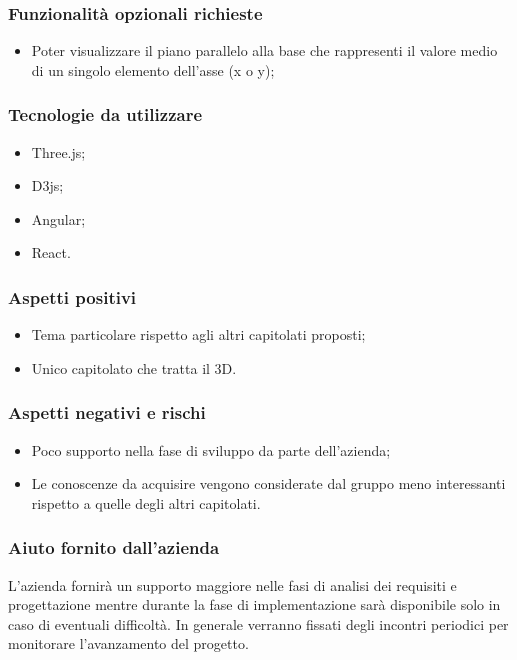 \documentclass[10pt]{article}
\begin{document}
\subsubsection{Funzionalità opzionali richieste}
\begin{itemize}
    \item Poter visualizzare il piano parallelo alla base che rappresenti il valore medio di un singolo elemento dell’asse (x o y);
\end{itemize}
\subsubsection{Tecnologie da utilizzare}
\begin{itemize}
    \item Three.js;
    \item D3js;
    \item Angular;
    \item React.
\end{itemize}
\subsubsection{Aspetti positivi}
\begin{itemize}
    \item Tema particolare rispetto agli altri capitolati proposti;
    \item Unico capitolato che tratta il 3D.
\end{itemize}
\subsubsection{Aspetti negativi e rischi}
\begin{itemize}
    \item Poco supporto nella fase di sviluppo da parte dell’azienda;
    \item Le conoscenze da acquisire vengono considerate dal gruppo meno interessanti rispetto a quelle degli altri capitolati.
\end{itemize}
\subsubsection{Aiuto fornito dall'azienda}
L'azienda fornirà un supporto maggiore nelle fasi di analisi dei requisiti e progettazione mentre durante la fase di implementazione sarà disponibile solo in caso di eventuali difficoltà. In generale verranno fissati degli incontri periodici per monitorare l'avanzamento del progetto.
\end{document}
